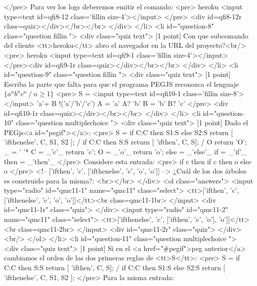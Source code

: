 \begin{rawhtml}
{      </pre>
      Para ver los logs deberemos emitir el comando:
      <pre>
       heroku <input type=text id=qfi8-12 class='fillin size-4'></input>
      </pre>
    <div id=qfi8-12r class=quiz></div></br></br>      </div>
    </li>
    <li id="question-8" class="question fillin ">
      <div class="quiz text">
[1 point] Con que subcomando del cliente <tt>heroku</tt> abro el navegador
    en la URL del proyecto?<br/>
    <pre>
    heroku <input type=text id=qfi9-1 class='fillin size-4'></input>
    </pre><div id=qfi9-1r class=quiz></div></br></br>      </div>
    </li>
    <li id="question-9" class="question fillin ">
      <div class="quiz text">
[1 point] 
      Escriba la parte que falta para que 
      el programa PEGJS reconozca el lenguaje
      $\{ a^n b^n c^n\ /\ n \ge{} 1\}$
      <pre>
      S = <input type=text id=qfi10-1 class='fillin size-8'></input> 'a'+ B !('a'/'b'/'c')
      A = 'a' A? 'b'
      B = 'b' B? 'c'
      </pre>
    <div id=qfi10-1r class=quiz></div></br></br>      </div>
    </li>
    <li id="question-10" class="question multiplechoice ">
      <div class="quiz text">
[1 point] 
Dado el PEGjs<a id="pegif"></a>:
<pre>
S =   if C:C then S1:S else S2:S { return [ 'ifthenelse', C, S1, S2 ]; }
    / if C:C then S:S            { return [ 'ifthen', C, S]; }
    / O                          { return 'O'; }
_ = ' '*
C = _'c'_                        { return 'c'; }
O = _'o'_                        { return 'o'; }
else = _'else'_                 
if = _'if'_
then = _'then'_    
</pre>
Considere esta entrada:
<pre>
if c then if c then o else o
</pre>
<!-- ['ifthen', 'c', ['ifthenelse', 'c', 'o', 'o']] -->
¿Cuál de los dos árboles es construido para la misma?:
<br></br>      </div>
      <ol class="answers">
        <input type="radio" id="qmc11-1" name="qmc11" class="select">
<tt>['ifthen', 'c', ['ifthenelse', 'c', 'o', 'o']]</tt><br class=qmc11-1br>        </input>
        <div id="qmc11-1r" class="quiz">
        </div>
        <input type="radio" id="qmc11-2" name="qmc11" class="select">
<tt>['ifthenelse', 'c', ['ifthen', 'c', 'o'], 'o']]</tt><br class=qmc11-2br>        </input>
        <div id="qmc11-2r" class="quiz">
        </div>
        <br/>
      </ol>
    </li>
    <li id="question-11" class="question multiplechoice ">
      <div class="quiz text">
[1 point] Si en el <a href="#pegif">peg anterior</a> cambiamos el orden de las dos primeras reglas de <tt>S</tt>:
<pre>
  S =   if C:C then S:S            { return [ 'ifthen', C, S]; }
      / if C:C then S1:S else S2:S { return [ 'ifthenelse', C, S1, S2 ]; }
</pre>
Para la misma entrada:
}
\end{rawhtml}
